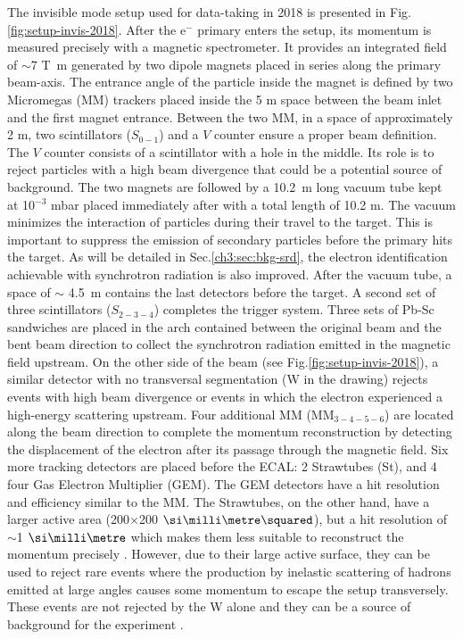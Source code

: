 The invisible mode setup used for data-taking in 2018 is presented in Fig.\ref{fig:setup-invis-2018}. After the e$^-$ primary enters the setup, its momentum is measured precisely with a magnetic spectrometer. It provides an integrated field of $\sim 7$ \si{\tesla\meter} generated by two dipole magnets \cite{mbpl} placed in series along the primary beam-axis. The entrance angle of the particle inside the magnet is defined by two Micromegas (MM) trackers placed inside the 5 m space between the beam inlet and the first magnet entrance. Between the two MM, in a space of approximately 2 m, two scintillators ($S_{0-1}$) and a $V$ counter ensure a proper beam definition. The $V$ counter consists of a scintillator with a hole in the middle. Its role is to reject particles with a high beam divergence that could be a potential source of background. The two magnets are followed by a \SI{10.2}{\meter} long vacuum tube kept at 10$^{-3}$ \si{mbar} placed immediately after with a total length of 10.2 \si{m}. The vacuum minimizes the interaction of particles during their travel to the target. This is important to suppress the emission of secondary particles before the primary hits the target. As will be detailed in Sec.\ref{ch3:sec:bkg-srd}, the electron identification achievable with synchrotron radiation is also improved. After the vacuum tube, a space of $\sim$ \SI{4.5}{\meter} contains the last detectors before the target. A second set of three scintillators ($S_{2-3-4}$) completes the trigger system. Three sets of Pb-Sc sandwiches are placed in the arch contained between the original beam and the bent beam direction to collect the synchrotron radiation emitted in the magnetic field upstream. On the other side of the beam (see Fig.\ref{fig:setup-invis-2018}), a similar detector with no transversal segmentation (W in the drawing) rejects events with high beam divergence or events in which the electron experienced a high-energy scattering upstream. Four additional MM (MM$_{3-4-5-6}$) are located along the beam direction to complete the momentum reconstruction by detecting the displacement of the electron after its passage through the magnetic field. Six more tracking detectors are placed before the ECAL: 2 Strawtubes (St), and 4 four Gas Electron Multiplier (GEM). The GEM detectors have a hit resolution and efficiency similar to the MM.
The Strawtubes, on the other hand, have a larger active area (200$\times$200 $\mms$), but a hit resolution of $\sim$1 $\mmi$ which makes them less suitable to reconstruct the momentum precisely \cite{Volkov:2019qhb}. However, due to their large active surface, they can be used to reject rare events where the production by inelastic scattering of hadrons emitted at large angles causes some momentum to escape the setup transversely. These events are not rejected by the W alone and they can be a source of background for the experiment \cite{na64-prd}. 

